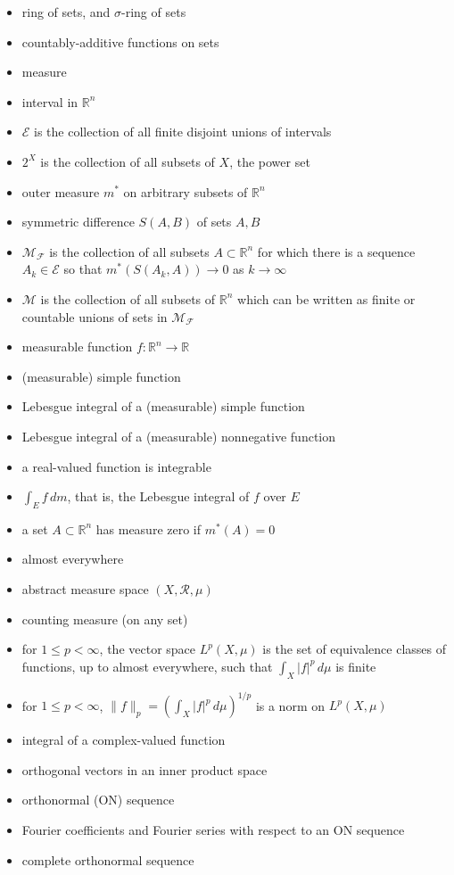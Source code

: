 \documentclass[12pt]{amsart}
\newcommand{\cE}{\mathcal{E}}
\newcommand{\cF}{\mathcal{F}}
\newcommand{\cM}{\mathcal{M}}
\newcommand{\cR}{\mathcal{R}}
\newcommand{\RR}{{\mathbb{R}}}
\begin{document}
\begin{itemize}
\item ring of sets, and $\sigma$-ring of sets
\item countably-additive functions on sets
\item measure
\item interval in $\RR^n$
\item $\cE$ is the collection of all finite disjoint unions of intervals
\item $2^X$ is the collection of all subsets of $X$, the power set
\item outer measure $m^*$ on arbitrary subsets of $\RR^n$
\item symmetric difference $S(A,B)$ of sets $A,B$
\item $\cM_\cF$ is the collection of all subsets $A\subset \RR^n$ for which there is a sequence $A_k\in\cE$ so that $m^*(S(A_k,A))\to 0$ as $k\to\infty$
\item $\cM$ is the collection of all subsets of $\RR^n$ which can be written as finite or countable unions of sets in $\cM_\cF$
\item measurable function $f:\RR^n\to \RR$
\item (measurable) simple function
\item Lebesgue integral of a (measurable) simple function
\item Lebesgue integral of a (measurable) nonnegative function
\item a real-valued function is integrable
\item $\int_E f\,dm$, that is, the Lebesgue integral of $f$ over $E$
\item a set $A\subset \RR^n$ has measure zero if $m^*(A)=0$
\item almost everywhere
\item abstract measure space $(X,\cR,\mu)$
\item counting measure (on any set)
\item for $1\le p < \infty$, the vector space $L^p(X,\mu)$ is the set of equivalence classes of functions, up to almost everywhere, such that $\int_X |f|^p\,d\mu$ is finite
\item for $1\le p < \infty$, $\|f\|_p = \left(\int_X |f|^p\,d\mu\right)^{1/p}$ is a norm on  $L^p(X,\mu)$
\item integral of a complex-valued function
\item orthogonal vectors in an inner product space
\item orthonormal (ON) sequence
\item Fourier coefficients and Fourier series with respect to an ON sequence
\item complete orthonormal sequence
\end{itemize}
\end{document}
